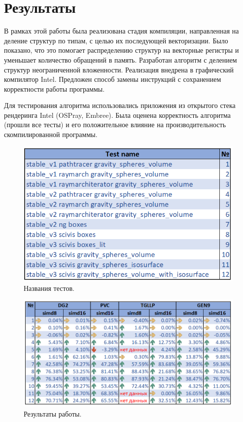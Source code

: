\section{Результаты}
\label{sec:conclusion-future}
В рамках этой работы была реализована стадия компиляции, направленная на деление структур по типам, с целью их последующей векторизации.
Было показано, что это помогает распределению структур на векторные регистры и уменьшает количество обращений в память.
Разработан алгоритм с делением структур неограниченной вложенности.
Реализация внедрена в графический компилятор Intel.
Предложен способ замены инструкций с сохранением корректности работы программы.

Для тестирования алгоритма использовались приложения из открытого стека рендеринга Intel (OSPray, Embree).
Была оценена корректность алгоритма (прошли все тесты) и его положительное влияние на производительность скомпилированной программы.

\begin{figure}[h]
    \centering
    \includegraphics[scale=0.55]{Images/results_name.png}
    \caption{Названия тестов.}
    \label{fig:results_name}
\end{figure}

\begin{figure}[h]
    \centering
    \includegraphics[scale=0.54]{Images/results_pure.png}
    \caption{Результаты работы.}
    \label{fig:results_pure}
\end{figure}

